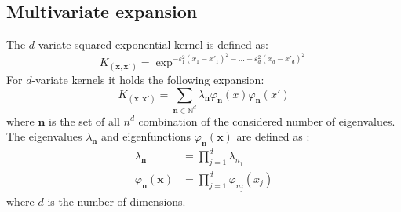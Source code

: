 \documentclass[10pt,a4paper,twocolumn]{article}
\begin{document}
\subsection{Multivariate expansion}
The $d$-variate squared exponential kernel is defined as:
\begin{equation}
	K_{(\mathbf{x}, \mathbf{x'})} = \exp^{-\varepsilon_1^2\left(x_1 - x'_1\right)^2  - \ldots - \varepsilon_d^2\left(x_d - x'_d\right)^2}
\end{equation}
For $d$-variate kernels it holds the following expansion:
\begin{equation}
	K_{(\mathbf{x},\mathbf{x'})} =  \sum_{\mathbf{n}\in \mathbb{N}^d} \lambda_{\mathbf{n}} \varphi_{\mathbf{n}}(x) \varphi_{\mathbf{n}}(x')
	\end{equation}
where $\mathbf{n}$ is the set of all $n^d$ combination of the considered number of eigenvalues.
The eigenvalues $\lambda_{\mathbf{n}}$ and eigenfunctions $\varphi_{\mathbf{n}}(\mathbf{x})$ are defined as \cite{fasshauer2012stable}:
\begin{align}
	\lambda_{\mathbf{n}} &= \prod_{j=1}^{d} \lambda_{n_j} \\
	\varphi_{\mathbf{n}}(\mathbf{x}) &= \prod_{j=1}^{d} \varphi_{n_{j}}(x_j)
\end{align}
where $d$ is the number of dimensions. 
	
\end{document}

